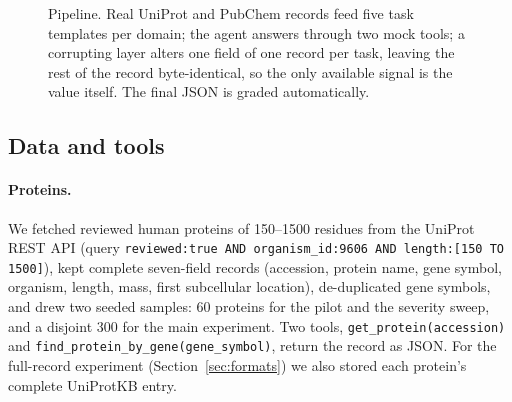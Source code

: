 \begin{figure}[t]
\caption{Pipeline. Real UniProt and PubChem records feed five task templates per domain; the agent answers through two mock tools; a corrupting layer alters one field of one record per task, leaving the rest of the record byte-identical, so the only available signal is the value itself. The final JSON is graded automatically.}
\label{fig:design}
\end{figure}

\subsection{Data and tools}
\label{sec:data}

\paragraph{Proteins.}
We fetched reviewed human proteins of 150--1500 residues from the UniProt REST API \citep{uniprot2025} (query \texttt{reviewed:true AND organism\_id:9606 AND length:[150 TO 1500]}), kept complete seven-field records (accession, protein name, gene symbol, organism, length, mass, first subcellular location), de-duplicated gene symbols, and drew two seeded samples: 60 proteins for the pilot and the severity sweep, and a disjoint 300 for the main experiment. Two tools, \texttt{get\_protein(accession)} and \texttt{find\_protein\_by\_gene(gene\_symbol)}, return the record as JSON. For the full-record experiment (Section~\ref{sec:formats}) we also stored each protein's complete UniProtKB entry.

